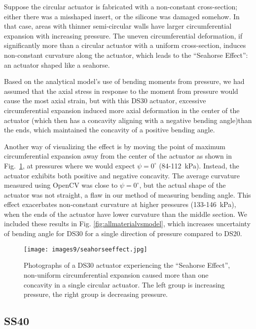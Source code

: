 Suppose the circular actuator is fabricated with a non-constant cross-section; either there was a misshaped insert, or the silicone was damaged somehow. In that case, areas with thinner semi-circular walls have larger circumferential expansion with increasing pressure. The uneven circumferential deformation, if significantly more than a circular actuator with a uniform cross-section, induces non-constant curvature along the actuator, which leads to the ``Seahorse Effect'': an actuator shaped like a seahorse. 

Based on the analytical model's use of bending moments from pressure, we had assumed that the axial stress in response to the moment from pressure would cause the most axial strain, but with this DS30 actuator, excessive circumferential expansion induced more axial deformation in the center of the actuator (which then has a concavity aligning with a negative bending angle)than the ends, which maintained the concavity of a positive bending angle.  

Another way of visualizing the effect is by moving the point of maximum circumferential expansion away from the center of the actuator as shown in Fig.~\ref{fig:seahorseeffect}, at pressures where we would expect $\psi=0^\circ$ (84-112~kPa). Instead, the actuator exhibits both positive and negative concavity. The average curvature measured using OpenCV was close to $\psi=0^\circ$, but the actual shape of the actuator was not straight, a flaw in our method of measuring bending angle. This effect exacerbates non-constant curvature at higher pressures (133-146~kPa), when the ends of the actuator have lower curvature than the middle section. We included these results in Fig. \ref{fig:allmaterialvsmodel}, which increases uncertainty of bending angle for DS30 for a single direction of pressure compared to DS20.

\begin{figure}[ht]
    \centering
     \texttt{[image: images9/seahorseeffect.jpg]}
    \caption{Photographs of a DS30 actuator experiencing the ``Seahorse Effect'', non-uniform circumferential expansion caused more than one concavity in a single circular actuator. The left group is increasing pressure, the right group is decreasing pressure.}
    \label{fig:seahorseeffect}
\end{figure}

\clearpage
\subsection{SS40}

